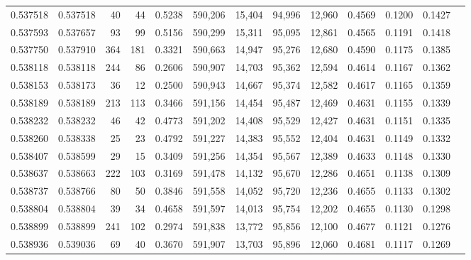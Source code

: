 \begin{tabular}{rrrrrrrrrrrrr}
0.537518 & 0.537518 &    40 &    44 &                                     0.5238 & 590,206 &  15,404 &  94,996 &  12,960 & 0.4569 & 0.1200 & 0.1427 \\
0.537593 & 0.537657 &    93 &    99 &                                     0.5156 & 590,299 &  15,311 &  95,095 &  12,861 & 0.4565 & 0.1191 & 0.1418 \\
0.537750 & 0.537910 &   364 &   181 &                                     0.3321 & 590,663 &  14,947 &  95,276 &  12,680 & 0.4590 & 0.1175 & 0.1385 \\
0.538118 & 0.538118 &   244 &    86 &                                     0.2606 & 590,907 &  14,703 &  95,362 &  12,594 & 0.4614 & 0.1167 & 0.1362 \\
0.538153 & 0.538173 &    36 &    12 &                                     0.2500 & 590,943 &  14,667 &  95,374 &  12,582 & 0.4617 & 0.1165 & 0.1359 \\
0.538189 & 0.538189 &   213 &   113 &                                     0.3466 & 591,156 &  14,454 &  95,487 &  12,469 & 0.4631 & 0.1155 & 0.1339 \\
0.538232 & 0.538232 &    46 &    42 &                                     0.4773 & 591,202 &  14,408 &  95,529 &  12,427 & 0.4631 & 0.1151 & 0.1335 \\
0.538260 & 0.538338 &    25 &    23 &                                     0.4792 & 591,227 &  14,383 &  95,552 &  12,404 & 0.4631 & 0.1149 & 0.1332 \\
0.538407 & 0.538599 &    29 &    15 &                                     0.3409 & 591,256 &  14,354 &  95,567 &  12,389 & 0.4633 & 0.1148 & 0.1330 \\
0.538637 & 0.538663 &   222 &   103 &                                     0.3169 & 591,478 &  14,132 &  95,670 &  12,286 & 0.4651 & 0.1138 & 0.1309 \\
0.538737 & 0.538766 &    80 &    50 &                                     0.3846 & 591,558 &  14,052 &  95,720 &  12,236 & 0.4655 & 0.1133 & 0.1302 \\
0.538804 & 0.538804 &    39 &    34 &                                     0.4658 & 591,597 &  14,013 &  95,754 &  12,202 & 0.4655 & 0.1130 & 0.1298 \\
0.538899 & 0.538899 &   241 &   102 &                                     0.2974 & 591,838 &  13,772 &  95,856 &  12,100 & 0.4677 & 0.1121 & 0.1276 \\
0.538936 & 0.539036 &    69 &    40 &                                     0.3670 & 591,907 &  13,703 &  95,896 &  12,060 & 0.4681 & 0.1117 & 0.1269 \\

\end{tabular}
